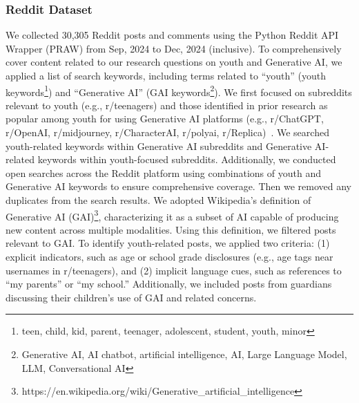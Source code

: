 \subsubsection{Reddit Dataset}
\vspace{-3pt}
\label{sec:reddit-data-collection}
We collected 30,305 Reddit posts and comments using the Python Reddit API Wrapper (PRAW) from Sep, 2024 to Dec, 2024 (inclusive).
To comprehensively cover content related to our research questions on youth and Generative AI, we applied a list of search keywords, including terms related to ``youth'' (youth keywords\footnote{teen, child, kid, parent, teenager, adolescent, student, youth, minor}) and ``Generative AI'' (GAI keywords\footnote{Generative AI, AI chatbot, artificial intelligence, AI, Large Language Model, LLM, Conversational AI}). We first focused on subreddits relevant to youth (e.g., r/teenagers) and those identified in prior research as popular among youth for using Generative AI platforms (e.g., r/ChatGPT, r/OpenAI, r/midjourney, r/CharacterAI, r/polyai, r/Replica)~\cite{chew2021predicting,Yu2024Exploring}. We searched youth-related keywords within Generative AI subreddits and Generative AI-related keywords within youth-focused subreddits. Additionally, we conducted open searches across the Reddit platform using combinations of youth and Generative AI keywords to ensure comprehensive coverage. Then we removed any duplicates from the search results. We adopted Wikipedia's definition of Generative AI (GAI)\footnote{https://en.wikipedia.org/wiki/Generative\_artificial\_intelligence}, characterizing it as a subset of AI capable of producing new content across multiple modalities. Using this definition, we filtered posts relevant to GAI. To identify youth-related posts, we applied two criteria: (1) explicit indicators, such as age or school grade disclosures (e.g., age tags near usernames in r/teenagers), and (2) implicit language cues, such as references to ``my parents'' or ``my school.'' Additionally, we included posts from guardians discussing their children's use of GAI and related concerns.

\vspace{-8pt}
